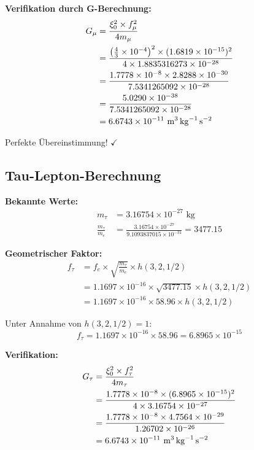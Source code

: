 \documentclass[12pt,a4paper]{article}
\theoremstyle{definition}
\begin{document}
	\textbf{Verifikation durch G-Berechnung:}
	\begin{align}
		G_\mu &= \frac{\xi_0^2 \times f_\mu^2}{4m_\mu}\\
		&= \frac{\left(\frac{4}{3} \times 10^{-4}\right)^2 \times (1.6819 \times 10^{-15})^2}{4 \times 1.8835316273 \times 10^{-28}}\\
		&= \frac{1.7778 \times 10^{-8} \times 2.8288 \times 10^{-30}}{7.5341265092 \times 10^{-28}}\\
		&= \frac{5.0290 \times 10^{-38}}{7.5341265092 \times 10^{-28}}\\
		&= 6.6743 \times 10^{-11} \text{ \si{\metre\cubed\per\kilogram\per\second\squared}}
	\end{align}
	
	Perfekte Übereinstimmung! $\checkmark$
	
	\subsection{Tau-Lepton-Berechnung}
	
	\textbf{Bekannte Werte:}
	\begin{align}
		m_\tau &= 3.16754 \times 10^{-27} \text{ kg}\\
		\frac{m_\tau}{m_e} &= \frac{3.16754 \times 10^{-27}}{9.1093837015 \times 10^{-31}} = 3477.15
	\end{align}
	
	\textbf{Geometrischer Faktor:}
	\begin{align}
		f_\tau &= f_e \times \sqrt{\frac{m_\tau}{m_e}} \times h(3,2,1/2)\\
		&= 1.1697 \times 10^{-16} \times \sqrt{3477.15} \times h(3,2,1/2)\\
		&= 1.1697 \times 10^{-16} \times 58.96 \times h(3,2,1/2)
	\end{align}
	
	Unter Annahme von $h(3,2,1/2) = 1$:
	\begin{equation}
		f_\tau = 1.1697 \times 10^{-16} \times 58.96 = 6.8965 \times 10^{-15}
	\end{equation}
	
	\textbf{Verifikation:}
	\begin{align}
		G_\tau &= \frac{\xi_0^2 \times f_\tau^2}{4m_\tau}\\
		&= \frac{1.7778 \times 10^{-8} \times (6.8965 \times 10^{-15})^2}{4 \times 3.16754 \times 10^{-27}}\\
		&= \frac{1.7778 \times 10^{-8} \times 4.7564 \times 10^{-29}}{1.26702 \times 10^{-26}}\\
		&= 6.6743 \times 10^{-11} \text{ \si{\metre\cubed\per\kilogram\per\second\squared}}
	\end{align}
	
\end{document}
